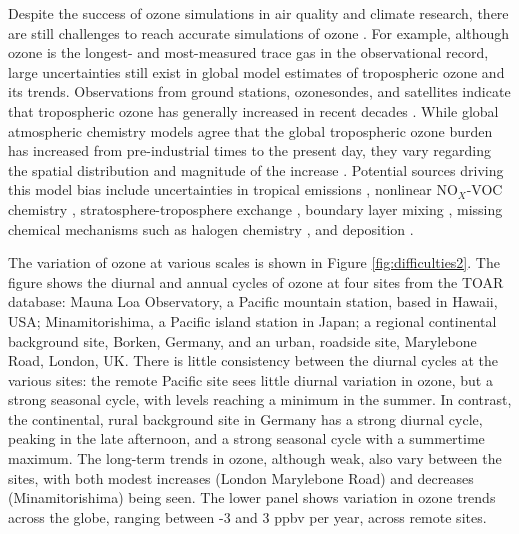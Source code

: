 \documentclass[gmd, manuscript]{copernicus}
\begin{document}
Despite the success of ozone simulations in air quality and climate research, there are still challenges to reach accurate simulations of ozone \citep{young_tropospheric_2018}. For example, although ozone is the longest- and most-measured trace gas in the observational record, large uncertainties still exist in global model estimates of tropospheric ozone and its trends. Observations from ground stations, ozonesondes, and satellites indicate that tropospheric ozone has generally increased in recent decades \citep{ziemke_trends_2019, young_tropospheric_2018, IPCC_2021_WGI_Ch_2}. While global atmospheric chemistry models agree that the global tropospheric ozone burden has increased from pre-industrial times to the present day, they vary regarding the spatial distribution and magnitude of the increase \citep{skeie_historical_2020, christiansen_multidecadal_2022, fiore_understanding_2022}. Potential sources driving this model bias include uncertainties in tropical emissions \citep{zhang_contributions_2021}, nonlinear NO$_X$-VOC chemistry \citep{shah_nitrogen_2023}, stratosphere-troposphere exchange \citep{neu_tropospheric_2014}, boundary layer mixing \citep{lu_exploring_2019}, missing chemical mechanisms such as halogen chemistry \citep{wang_active_2015}, and deposition \citep{clifton_dry_2020}. 


The variation of ozone at various scales is shown in Figure \ref{fig:difficulties2}.  The figure shows the diurnal and annual cycles of ozone at four sites from the TOAR database: Mauna Loa Observatory, a Pacific mountain station, based in Hawaii, USA;  Minamitorishima, a Pacific island station in Japan; a regional continental background site, Borken, Germany, and an urban, roadside site, Marylebone Road, London, UK.  There is little consistency between the diurnal cycles at the various sites: the remote Pacific site sees little diurnal variation in ozone, but a strong seasonal cycle, with levels reaching a minimum in the summer.  In contrast, the continental, rural background site in Germany has a strong diurnal cycle, peaking in the late afternoon, and a strong seasonal cycle with a summertime maximum. The long-term trends in ozone, although weak, also vary between the sites, with both modest increases (London Marylebone Road) and decreases (Minamitorishima) being seen. The lower panel shows variation in ozone trends across the globe, ranging between -3 and 3 ppbv per year, across remote sites.  
\end{document}
